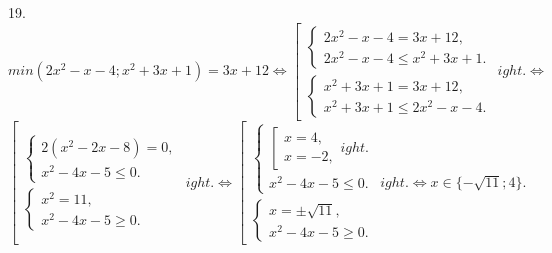 19. $min(2x^2-x-4; x^2+3x+1)=3x+12\Leftrightarrow\left[\begin{array}{l}\begin{cases}2x^2-x-4=3x+12,\\ 2x^2-x-4\leqslant x^2+3x+1.\end{cases}\\ \begin{cases}x^2+3x+1=3x+12,\\ x^2+3x+1\leqslant 2x^2-x-4.\end{cases}\end{array}
ight. \Leftrightarrow$\\$\left[\begin{array}{l}\begin{cases}2(x^2-2x-8)=0,\\ x^2-4x-5\leqslant 0.\end{cases}\\ \begin{cases} x^2=11,\\ x^2-4x-5\geqslant 0.\end{cases}\end{array}
ight.\Leftrightarrow\left[\begin{array}{l}\begin{cases}
\left[\begin{array}{l} x=4,\\ x=-2,\end{array}
ight.\\ x^2-4x-5\leqslant 0.\end{cases}\\ \begin{cases} x=\pm\sqrt{11},\\ x^2-4x-5\geqslant 0.\end{cases}\end{array}
ight.\Leftrightarrow x\in\{-\sqrt{11};4\}.$\\
